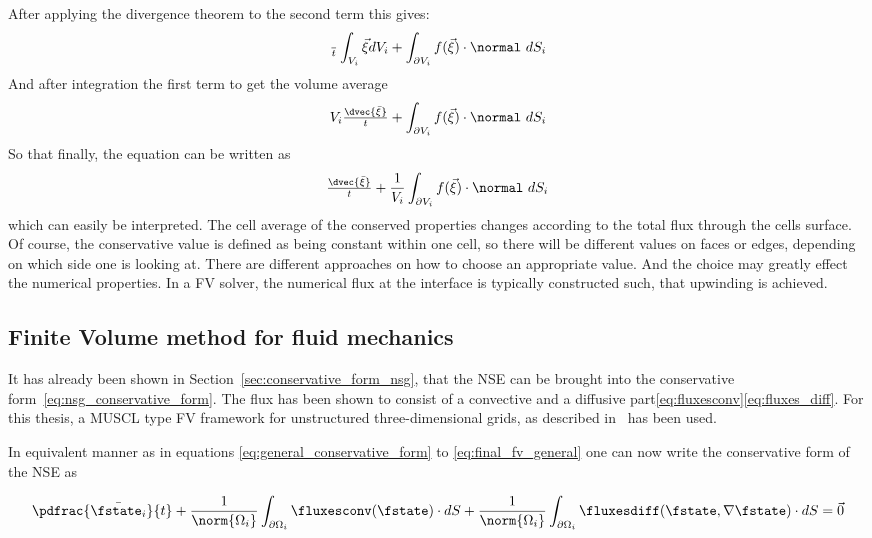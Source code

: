 \documentclass[../main.tex]{subfiles}
\begin{document}
After applying the divergence theorem to the second term this gives:
\begin{align}
\tfrac{~}{t}\int_{V_i} \vec{\xi} dV_i + \int_{\partial V_i} f(\vec{\xi})\cdot\normal~dS_i
\end{align}
And after integration the first term to get the volume average
\begin{align}
V_i \tfrac{\dvec{\bar{\xi}}}{t} + \int_{\partial V_i} f(\vec{\xi})\cdot\normal~dS_i
\end{align}
So that finally, the equation can be written as
\begin{align}\label{eq:final_fv_general}
\tfrac{\dvec{\bar{\xi}}}{t} + \frac{1}{V_i} \int_{\partial V_i} f(\vec{\xi})\cdot\normal~dS_i
\end{align}
which can easily be interpreted. The cell average of the conserved properties changes according to the total flux through the cells surface.
Of course, the conservative value is defined as being constant within one cell, so there will be different values on faces or edges, depending on which side one is looking at. There are different approaches on how to choose an appropriate value. And the choice may greatly effect the numerical properties. In a \ac{FV} solver, the numerical flux at the interface is typically constructed such, that upwinding is achieved.

\subsection{Finite Volume method for fluid mechanics}\label{sec:fv_fluid_mechanics}
It has already been shown in Section~\ref{sec:conservative_form_nsg}, that the \ac{NSE} can be brought into the conservative form~\eqref{eq:nsg_conservative_form}. The flux has been shown to consist of a convective and a diffusive part\eqref{eq:fluxesconv}\eqref{eq:fluxes_diff}.
For this thesis, a \ac{MUSCL} type \ac{FV} framework for unstructured three-dimensional grids, as described in~\cite{Main2014} has been used.



In equivalent manner as in equations \eqref{eq:general_conservative_form} to \eqref{eq:final_fv_general} one can now write the conservative form of the \ac{NSE} as

\begin{align}\label{eq:NSE_full_FV formulation}
\pdfrac{\bar{\fstate_i}}{t} +
\frac{1}{\norm{\Omega_i}} \int_{\partial\Omega_i} \fluxesconv(\fstate)\cdot dS +
\frac{1}{\norm{\Omega_i}} \int_{\partial\Omega_i} \fluxesdiff(\fstate,\nabla \fstate)\cdot dS =
\vec{0}
\end{align}
\end{document}
